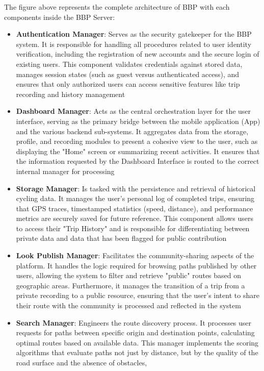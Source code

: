 The figure above represents the complete architecture of BBP with each components inside the BBP Server:
\begin{itemize}
	\item \textbf{Authentication Manager}: Serves as the security gatekeeper for the BBP system. It is responsible for handling all procedures related to user identity verification, 
	including the registration of new accounts and the secure login of existing users. This component validates credentials against stored data, manages session states 
	(such as guest versus authenticated access), and ensures that only authorized users can access sensitive features like trip recording and history management
	\item \textbf{Dashboard Manager}: Acts as the central orchestration layer for the user interface, serving as the primary bridge between the mobile application (App) 
	and the various backend sub-systems. It aggregates data from the storage, profile, and recording modules to present a cohesive view to the user, such as displaying the "Home" screen 
	or summarizing recent activities. It ensures that the information requested by the Dashboard Interface is routed to the correct internal manager for processing
	\item \textbf{Storage Manager}: Is tasked with the persistence and retrieval of historical cycling data. It manages the user's personal log of completed trips, ensuring that GPS traces, 
	timestamped statistics (speed, distance), and performance metrics are securely saved for future reference. This component allows users to access their "Trip History" and is responsible 
	for differentiating between private data and data that has been flagged for public contribution
	\item \textbf{Look Publish Manager}: Facilitates the community-sharing aspects of the platform. It handles the logic required for browsing paths published by other users, 
	allowing the system to filter and retrieve "public" routes based on geographic areas. Furthermore, it manages the transition of a trip from a private recording to 
	a public resource, ensuring that the user's intent to share their route with the community is processed and reflected in the system
	\item \textbf{Search Manager}: Engineers the route discovery process. It processes user requests for paths between specific origin and destination points, calculating optimal 
	routes based on available data. This manager implements the scoring algorithms that evaluate paths not just by distance, but by the quality of the road surface and the absence of obstacles, 

\end{itemize}
